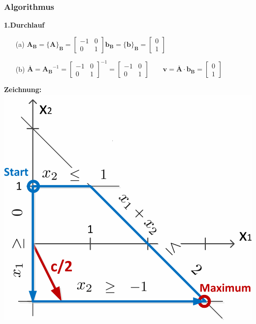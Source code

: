 \begin{minipage}[t]{0.66\textwidth}
\subsubsection{Algorithmus}
 
\textbf{1.Durchlauf}
\begin{itemize}
\item[(a)] $\mathbf{A_B}=\{\mathbf{A}\}_{\mathbf{B}}=\begin{bmatrix}-1&0\\0&1\end{bmatrix}$\qquad $\mathbf{b}_\mathbf{B}=\{\mathbf{b}\}_{\mathbf{B}}=\begin{bmatrix}0\\1\end{bmatrix}$
\item[(b)] $\overline{\mathbf{A}}=\mathbf{A_B}^{-1}=\begin{bmatrix}-1&0\\0&1\end{bmatrix}^{-1}=\begin{bmatrix}-1&0\\0&1\end{bmatrix}\qquad
\mathbf{v}=\mathbf{\overline{A}}\cdot\mathbf{b_B}=\begin{bmatrix}0\\1\end{bmatrix}$


\end{itemize}
\end{minipage}
\hfill
\begin{minipage}[t]{0.30\textwidth}
\textbf{Zeichnung:}\\
\includegraphics[width=\linewidth]{Content/Simplex/Polyeder.png} 
\end{minipage}
